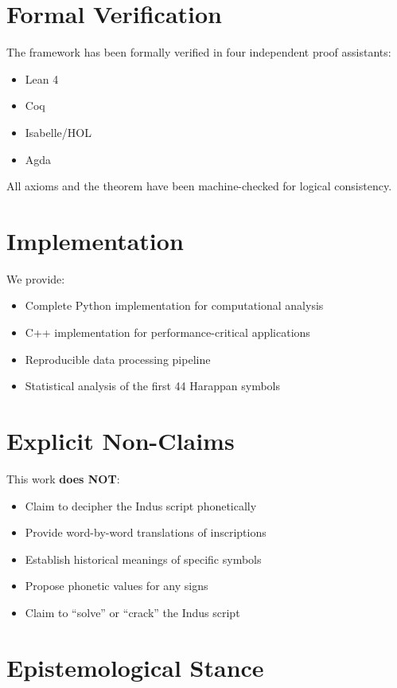\section*{Formal Verification}

The framework has been formally verified in four independent proof assistants:
\begin{itemize}
    \item Lean 4
    \item Coq
    \item Isabelle/HOL
    \item Agda
\end{itemize}

All axioms and the \TCOP{} theorem have been machine-checked for logical consistency.

\section*{Implementation}

We provide:
\begin{itemize}
    \item Complete Python implementation for computational analysis
    \item C++ implementation for performance-critical applications
    \item Reproducible data processing pipeline
    \item Statistical analysis of the first 44 Harappan symbols
\end{itemize}

\section*{Explicit Non-Claims}

This work \textbf{does NOT}:
\begin{itemize}
    \item Claim to decipher the Indus script phonetically
    \item Provide word-by-word translations of inscriptions
    \item Establish historical meanings of specific symbols
    \item Propose phonetic values for any signs
    \item Claim to ``solve'' or ``crack'' the Indus script
\end{itemize}

\section*{Epistemological Stance}

